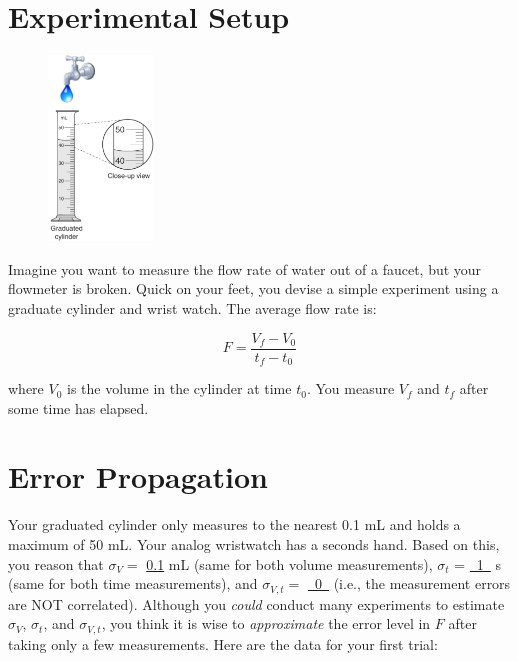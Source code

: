 \documentclass[12pt,twoside]{article}
\title{\assignmentname}
\author{CBE 20258 / CBE 40258 / CBE 60258}
\newcommand{\fillin}[1]{{\color{white} \large #1}}
\begin{document}

\date{November 5, 2019}



\maketitle

\section{Experimental Setup}

\begin{figure}
	\centering
	\includegraphics[width=0.25\textwidth]{experiment}
\end{figure}

Imagine you want to measure the flow rate of water out of a faucet, but your flowmeter is broken. Quick on your feet, you devise a simple experiment using a graduate cylinder and wrist watch. The average flow rate is:

\begin{equation}
	F = \frac{V_{f} - V_{0}}{t_{f} - t_{0}} \label{eq:main}
\end{equation}

where $V_{0}$ is the volume in the cylinder at time $t_{0}$. You measure $V_{f}$ and $t_f$ after some time has elapsed.

\section{Error Propagation}

Your graduated cylinder only measures to the nearest 0.1 mL and holds a maximum of 50 mL. Your analog wristwatch has a seconds hand. Based on this, you reason that $\sigma_V = $ \underline{\fillin{0.1}} mL (same for both volume measurements), $\sigma_t$ = \underline{\fillin{~1~}} s (same for both time measurements), and $\sigma_{V,t} =$ \underline{\fillin{~0~}} (i.e., the measurement errors are NOT correlated). Although you \emph{could} conduct many experiments to estimate $\sigma_V$, $\sigma_t$, and $\sigma_{V,t}$, you think it is wise to \emph{approximate} the error level in $F$ after taking only a few measurements. Here are the data for your first trial:
\end{document}
